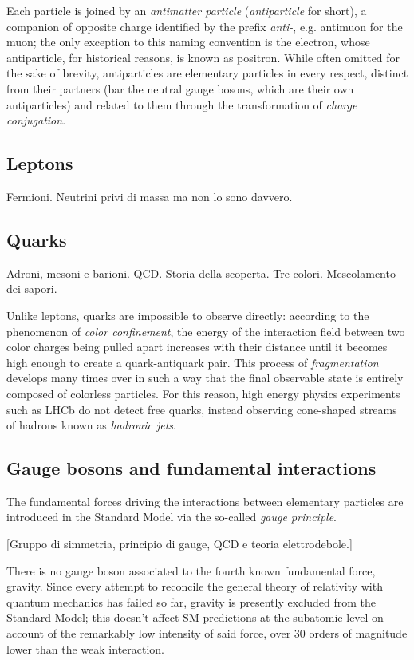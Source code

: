 Each particle is joined by an \textit{antimatter particle} (\textit{antiparticle} for short), a companion of opposite charge identified by the prefix \textit{anti-}, e.g. antimuon for the muon; the only exception to this naming convention is the electron, whose antiparticle, for historical reasons, is known as positron.
While often omitted for the sake of brevity, antiparticles are elementary particles in every respect, distinct from their partners (bar the neutral gauge bosons, which are their own antiparticles) and related to them through the transformation of \textit{charge conjugation}.

\subsection{Leptons}
Fermioni. Neutrini privi di massa ma non lo sono davvero.

\subsection{Quarks}
Adroni, mesoni e barioni. QCD. Storia della scoperta. Tre colori. Mescolamento dei sapori.

Unlike leptons, quarks are impossible to observe directly: according to the phenomenon of \textit{color confinement}, the energy of the interaction field between two color charges being pulled apart increases with their distance until it becomes high enough to create a quark-antiquark pair.
This process of \textit{fragmentation} develops many times over in such a way that the final observable state is entirely composed of colorless particles.
For this reason, high energy physics experiments such as LHCb do not detect free quarks, instead observing cone-shaped streams of hadrons known as \textit{hadronic jets}.

\subsection{Gauge bosons and fundamental interactions}
The fundamental forces driving the interactions between elementary particles are introduced in the Standard Model via the so-called \textit{gauge principle}.

[Gruppo di simmetria, principio di gauge, QCD e teoria elettrodebole.]

There is no gauge boson associated to the fourth known fundamental force, gravity.
Since every attempt to reconcile the general theory of relativity with quantum mechanics has failed so far, gravity is presently excluded from the Standard Model; this doesn't affect SM predictions at the subatomic level on account of the remarkably low intensity of said force, over 30 orders of magnitude lower than the weak interaction.

